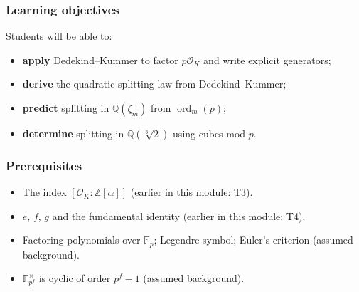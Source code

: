 \documentclass[11pt]{article}
\newcommand{\Z}{\mathbb{Z}}
\newcommand{\Q}{\mathbb{Q}}
\newcommand{\F}{\mathbb{F}}
\newcommand{\OK}{\mathcal{O}_K}
\DeclareMathOperator{\ord}{ord}
\begin{document}
\subsubsection*{Learning objectives}
Students will be able to:
\begin{itemize}
  \item \textbf{apply} Dedekind--Kummer to factor $p\OK$ and write explicit generators;
  \item \textbf{derive} the quadratic splitting law from Dedekind--Kummer;
  \item \textbf{predict} splitting in $\Q(\zeta_m)$ from $\ord_m(p)$;
  \item \textbf{determine} splitting in $\Q(\sqrt[3]2)$ using cubes mod $p$.
\end{itemize}

\subsubsection*{Prerequisites}
\begin{itemize}
  \item The index $[\OK:\Z[\alpha]]$ (earlier in this module: T3).
  \item $e$, $f$, $g$ and the fundamental identity (earlier in this module: T4).
  \item Factoring polynomials over $\F_p$; Legendre symbol; Euler's criterion (assumed background).
  \item $\F_{p^f}^\times$ is cyclic of order $p^f-1$ (assumed background).
\end{itemize}
\end{document}
